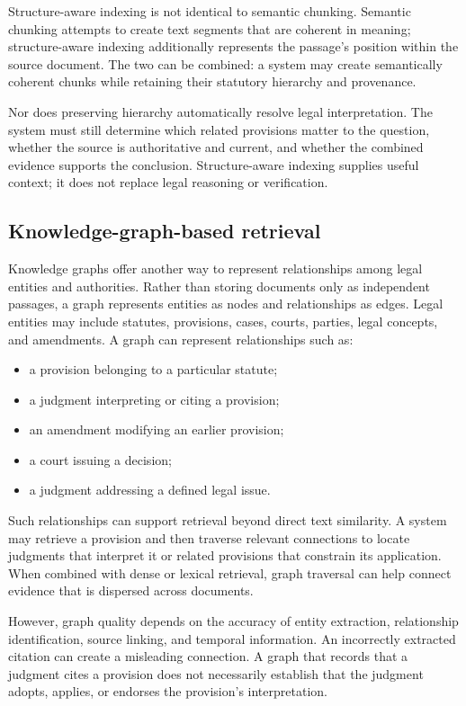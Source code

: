 Structure-aware indexing is not identical to semantic chunking. Semantic chunking attempts to create
text segments that are coherent in meaning; structure-aware indexing additionally represents the
passage's position within the source document. The two can be combined: a system may create
semantically coherent chunks while retaining their statutory hierarchy and provenance.

Nor does preserving hierarchy automatically resolve legal interpretation. The system must still
determine which related provisions matter to the question, whether the source is authoritative and
current, and whether the combined evidence supports the conclusion. Structure-aware indexing supplies
useful context; it does not replace legal reasoning or verification.

\subsection{Knowledge-graph-based retrieval}

Knowledge graphs offer another way to represent relationships among legal entities and authorities.
Rather than storing documents only as independent passages, a graph represents entities as nodes and
relationships as edges. Legal entities may include statutes, provisions, cases, courts, parties, legal
concepts, and amendments. A graph can represent relationships such as:
\begin{itemize}[leftmargin=1.4em, itemsep=1pt, topsep=2pt]
\item a provision belonging to a particular statute;
\item a judgment interpreting or citing a provision;
\item an amendment modifying an earlier provision;
\item a court issuing a decision;
\item a judgment addressing a defined legal issue.
\end{itemize}

Such relationships can support retrieval beyond direct text similarity. A system may retrieve a
provision and then traverse relevant connections to locate judgments that interpret it or related
provisions that constrain its application. When combined with dense or lexical retrieval, graph
traversal can help connect evidence that is dispersed across documents.

However, graph quality depends on the accuracy of entity extraction, relationship identification,
source linking, and temporal information. An incorrectly extracted citation can create a misleading
connection. A graph that records that a judgment cites a provision does not necessarily establish that
the judgment adopts, applies, or endorses the provision's interpretation.

